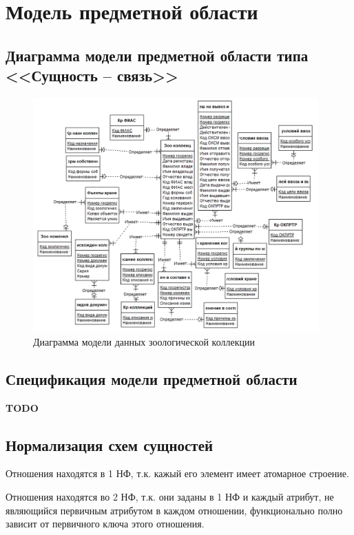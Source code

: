 \documentclass[10pt, a4paper, titlepage]{article}
\begin{document}
\section{Модель предметной области}

\subsection{Диаграмма модели предметной области типа <<Сущность -- связь>>}

\begin{figure}[H]
    \centering
    \includegraphics[height=9cm]{image.png}
    \caption{Диаграмма модели данных зоологической коллекции}
    \label{fig:er_diagram}
\end{figure}

\subsection{Спецификация модели предметной области}

{
    \color{red}
    \textbf{TODO}
}







\subsection{Нормализация схем сущностей}

Отношения находятся в 1 НФ, т.к. кажый его элемент имеет атомарное строение.

Отношения находятся во 2 НФ, т.к. они заданы в 1 НФ и каждый атрибут, не являющийся первичным атрибутом в каждом отношении, функционально полно зависит от первичного ключа этого отношения.
\end{document}
